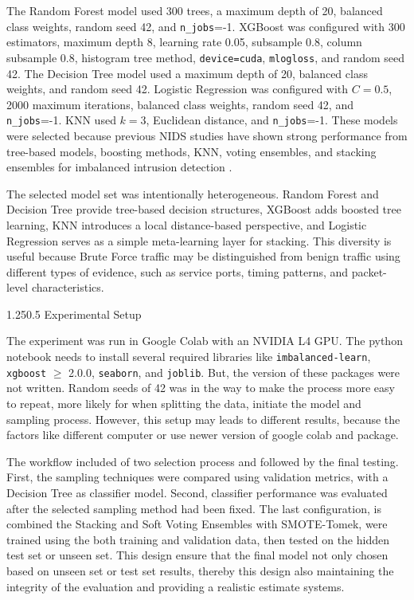 \documentclass[12pt,a4paper]{article}
\makeatletter
\renewcommand{\subsection}{\@startsection{subsection}{2}{0pt}%
  {1.25\baselineskip}{0.5\baselineskip}%
  {\normalfont\fontsize{13}{15.6}\selectfont\bfseries}}
\makeatother
\begin{document}
The Random Forest model used 300 trees, a maximum depth of 20, balanced class weights, random seed 42, and \texttt{n\_jobs}=-1. XGBoost was configured with 300 estimators, maximum depth 8, learning rate 0.05, subsample 0.8, column subsample 0.8, histogram tree method, \texttt{device=cuda}, \texttt{mlogloss}, and random seed 42. The Decision Tree model used a maximum depth of 20, balanced class weights, and random seed 42. Logistic Regression was configured with \(C=0.5\), 2000 maximum iterations, balanced class weights, random seed 42, and \texttt{n\_jobs}=-1. KNN used \(k=3\), Euclidean distance, and \texttt{n\_jobs}=-1. These models were selected because previous NIDS studies have shown strong performance from tree-based models, boosting methods, KNN, voting ensembles, and stacking ensembles for imbalanced intrusion detection \parencite{farooqi2024enhancing,urmi2024stacked,nassreddine2025ensemble}.

The selected model set was intentionally heterogeneous. Random Forest and Decision Tree provide tree-based decision structures, XGBoost adds boosted tree learning, KNN introduces a local distance-based perspective, and Logistic Regression serves as a simple meta-learning layer for stacking. This diversity is useful because Brute Force traffic may be distinguished from benign traffic using different types of evidence, such as service ports, timing patterns, and packet-level characteristics.


\subsection{Experimental Setup}

The experiment was run in Google Colab with an NVIDIA L4 GPU. The python notebook needs to install several required libraries like \texttt{imbalanced-learn}, \texttt{xgboost} \(\geq\) 2.0.0, \texttt{seaborn}, and \texttt{joblib}. But, the version of these packages were not written. Random seeds of 42 was in the way to make the process more easy to repeat, more likely for when splitting the data, initiate the model and sampling process. However, this setup may leads to different results, because the factors like different computer or use newer version of google colab and package.

The workflow included of two selection process and followed by the final testing. First, the sampling techniques were compared using validation metrics, with a Decision Tree as classifier model. Second, classifier performance was evaluated after the selected sampling method had been fixed. The last configuration, is combined the Stacking and Soft Voting Ensembles with SMOTE-Tomek, were trained using the both training and validation data, then tested on the hidden test set or unseen set. This design ensure that the final model not only chosen based on unseen set or test set results, thereby this design also maintaining the integrity of the evaluation and providing a realistic estimate systems.
\end{document}

